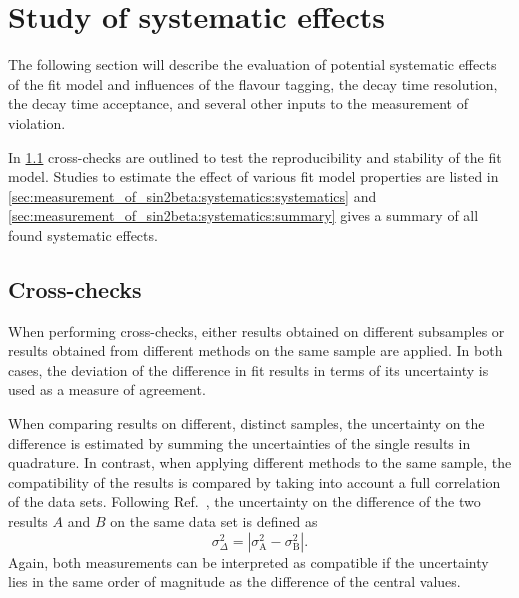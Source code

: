 
\section{Study of systematic effects}
\label{sec:measurement_of_sin2beta:systematics}

The following section will describe the evaluation of potential systematic
effects of the fit model and influences of the flavour tagging, the decay time
resolution, the decay time acceptance, and several other inputs to the
measurement of \CP violation.

In \cref{sec:measurement_of_sin2beta:systematics:cross_checks} cross-checks are
outlined to test the reproducibility and stability of the fit model. Studies to
estimate the effect of various fit model properties are listed in
\cref{sec:measurement_of_sin2beta:systematics:systematics} and
\cref{sec:measurement_of_sin2beta:systematics:summary} gives a summary of all
found systematic effects.

\subsection{Cross-checks}
\label{sec:measurement_of_sin2beta:systematics:cross_checks}

When performing cross-checks, either results obtained on different subsamples or
results obtained from different methods on the same sample are applied. In both
cases, the deviation of the difference in fit results in terms of its
uncertainty is used as a measure of agreement.

When comparing results on different, distinct samples, the uncertainty on the
difference is estimated by summing the uncertainties of the single results in
quadrature. In contrast, when applying different methods to the same sample, the
compatibility of the results is compared by taking into account a full
correlation of the data sets. Following Ref.~\cite{Barlow:2002yb}, the
uncertainty on the difference of the two results $A$ and $B$ on the same data
set is defined as
%
\begin{equation}
  \sigma^2_\Delta = \left\vert\sigma^2_{\text{A}} - \sigma^2_{\text{B}}\right\vert .
\end{equation}
%
Again, both measurements can be interpreted as compatible if the uncertainty
lies in the same order of magnitude as the difference of the central values.


